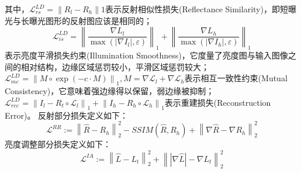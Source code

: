 \documentclass[letterpaper,12pt]{article}
\begin{document}
	其中，$\mathcal{L}_{rs}^{LD}=\left\|R_l-R_h\right\|1$表示反射相似性损失(Reflectance Similarity)，即短曝光与长曝光图形的反射图应该是相同的；$$\mathcal{L}_{is}^{LD}=\left\| \frac{\nabla L_{l}}{\max(\left| \nabla I_{l} \right|,\varepsilon)} \right\|_{1} + \left\| {\frac{\nabla L_{h}}{\max (\left| \nabla I_{h} \right| ,\varepsilon)}}\right\|_{1}$$表示亮度平滑损失约束(Illumination Smoothness)，它度量了亮度图与输入图像之间的相对结构，边缘区域惩罚较小，平滑区域惩罚较大；$\mathcal{L}_{mc}^{LD}={\left\|M\circ\exp(-c\cdot M)\right \|}_{1}, M=\nabla \mathcal{L}_{l}+\nabla \mathcal{L}_{h}$表示相互一致性约束(Mutual Consistency)，它意味着强边缘得以保留，弱边缘被抑制；$\mathcal{L}_{rec}^{LD}={\left \| I_l-R_t \circ \mathcal{L}_l\right\|}_{1} + {\left \| I_h-R_h \circ \mathcal{L}_h\right\|}_{1}$表示重建损失(Reconstruction Error)。
	反射部分损失定义如下：
	\begin{equation}
		\mathcal{L}^{RR}:={\left\| \hat{R}-R_{h} \right\|}^{2}_{2} - SSIM(\hat{R},R_{h}) + {\left\|\nabla\hat{R}-\nabla R_{h} \right\|}^{2}_{2}
	\end{equation}
	亮度调整部分损失定义如下：
	\begin{equation}
		\mathcal{L}^{IA}:={\left\| \hat{L}-L_{t} \right\|}^{2}_{2} + {\left\| \left|\nabla\hat{L}\right|-\nabla L_{t} \right\|}^{2}_{2}
	\end{equation}
	
\end{document}
